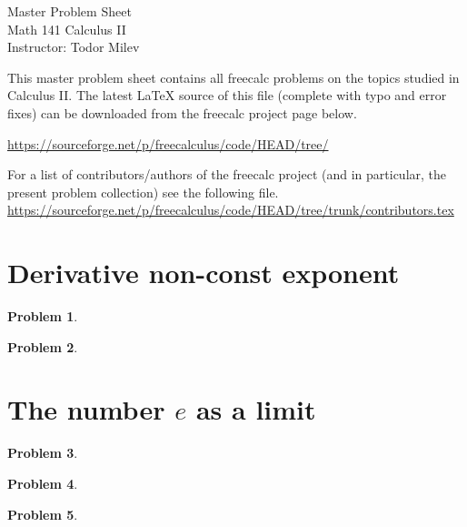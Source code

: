 \documentclass{article}
\newtheorem{problem}{Problem}
\begin{document}
\begin{center}
\Large
Master Problem Sheet \\ Math 141 Calculus II \\ \normalsize Instructor: Todor Milev
\end{center}


This master problem sheet contains all freecalc problems on the topics studied in Calculus II. The latest \LaTeX{} source of this file (complete with typo and error fixes) can be downloaded from the freecalc project page below. 

\url{https://sourceforge.net/p/freecalculus/code/HEAD/tree/}

For a list of contributors/authors of the freecalc project (and in particular, the present problem collection) see the following file.
\url{https://sourceforge.net/p/freecalculus/code/HEAD/tree/trunk/contributors.tex}

\section{Derivative non-const exponent }
\begin{problem}

\end{problem}


\begin{problem}

\end{problem}
\section{The number $e$ as a limit}
\begin{problem}

\end{problem}

\begin{problem}

\end{problem}
\begin{problem}

\end{problem}

\end{document}
